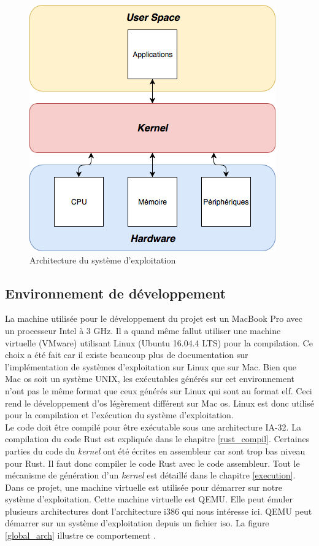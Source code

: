 \begin{figure}[!h]
    \centering
    \includegraphics[scale=0.75]{images/kernel.png}
    \caption{Architecture du système d'exploitation}
    \label{os_arch}
\end{figure}


\subsection{Environnement de développement}
\label{sec:arch:host}
La machine utilisée pour le développement du projet est un MacBook Pro avec un
processeur Intel à 3 GHz. Il a quand même fallut utiliser une machine virtuelle
(VMware) utilisant Linux (Ubuntu 16.04.4 LTS) pour la compilation. Ce choix a été
fait car il existe beaucoup plus de documentation sur l'implémentation de systèmes
d'exploitation sur Linux que sur Mac. Bien que Mac \acrshort{os} soit un système
UNIX, les exécutables générés sur cet environnement n'ont pas le même format que
ceux générés sur Linux qui sont au format \acrshort{elf}. Ceci rend le développement
d'\acrshort{os} légèrement différent sur Mac \acrshort{os}. Linux est donc utilisé
pour la compilation et l'exécution du système d'exploitation. \\

Le code doit être compilé pour être exécutable sous une architecture \acrshort{IA-32}.
La compilation du code Rust est expliquée dans le chapitre \ref{rust_compil}. Certaines
parties du code du \textit{kernel} ont été écrites en assembleur car sont trop
bas niveau pour Rust. Il faut donc compiler le code Rust avec le code assembleur.
Tout le mécanisme de génération d'un \textit{kernel} est détaillé
dans le chapitre \ref{execution}. Dans ce projet, une machine
virtuelle est utilisée pour démarrer sur notre système d'exploitation. Cette machine
virtuelle est QEMU. Elle peut émuler plusieurs architectures dont l'architecture
i386 qui nous intéresse ici. QEMU peut démarrer sur un système d'exploitation depuis
un fichier \acrshort{iso}. La figure \ref{global_arch} illustre ce comportement \cite{ref42}.

